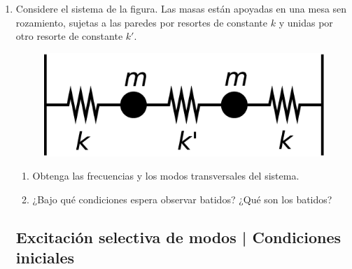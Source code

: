 \documentclass[11pt,spanish,a4paper]{article}
\begin{document}
\begin{enumerate}
\item Considere el sistema de la figura. Las masas están apoyadas en una mesa sen rozamiento, sujetas a las paredes por resortes de constante
$k$ y unidas por otro resorte de constante $k'$.
\begin{figure}[H]
\centering{}\includegraphics[clip,scale=0.25]{ej1-8}
\end{figure}
\begin{enumerate}
	\item Obtenga las frecuencias y los modos transversales del sistema. 
	\item ¿Bajo qué condiciones espera observar batidos?
	¿Qué son los batidos?
\end{enumerate}



\subsection*{Excitación selectiva de modos | Condiciones iniciales}



\end{enumerate}
\end{document}
